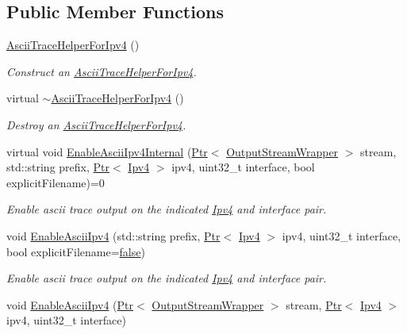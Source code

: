 \subsection*{Public Member Functions}
\begin{DoxyCompactItemize}
\item 
\hyperlink{classns3_1_1AsciiTraceHelperForIpv4_a7cc73dd91edbb5d28199b3a6654465da}{Ascii\+Trace\+Helper\+For\+Ipv4} ()
\begin{DoxyCompactList}\small\item\em Construct an \hyperlink{classns3_1_1AsciiTraceHelperForIpv4}{Ascii\+Trace\+Helper\+For\+Ipv4}. \end{DoxyCompactList}\item 
virtual \hyperlink{classns3_1_1AsciiTraceHelperForIpv4_a3d9df80563dbc6f871b49479ee050883}{$\sim$\+Ascii\+Trace\+Helper\+For\+Ipv4} ()
\begin{DoxyCompactList}\small\item\em Destroy an \hyperlink{classns3_1_1AsciiTraceHelperForIpv4}{Ascii\+Trace\+Helper\+For\+Ipv4}. \end{DoxyCompactList}\item 
virtual void \hyperlink{classns3_1_1AsciiTraceHelperForIpv4_afe9e8a865d66140f0b2b42b5381b437d}{Enable\+Ascii\+Ipv4\+Internal} (\hyperlink{classns3_1_1Ptr}{Ptr}$<$ \hyperlink{classns3_1_1OutputStreamWrapper}{Output\+Stream\+Wrapper} $>$ stream, std\+::string prefix, \hyperlink{classns3_1_1Ptr}{Ptr}$<$ \hyperlink{classns3_1_1Ipv4}{Ipv4} $>$ ipv4, uint32\+\_\+t interface, bool explicit\+Filename)=0
\begin{DoxyCompactList}\small\item\em Enable ascii trace output on the indicated \hyperlink{classns3_1_1Ipv4}{Ipv4} and interface pair. \end{DoxyCompactList}\item 
void \hyperlink{classns3_1_1AsciiTraceHelperForIpv4_af8eabc53dedba6de2921a3fb2330b44d}{Enable\+Ascii\+Ipv4} (std\+::string prefix, \hyperlink{classns3_1_1Ptr}{Ptr}$<$ \hyperlink{classns3_1_1Ipv4}{Ipv4} $>$ ipv4, uint32\+\_\+t interface, bool explicit\+Filename=\hyperlink{lte__cqi__generation_8m_ab1bef239d413c4da139c4bac92cd657a}{false})
\begin{DoxyCompactList}\small\item\em Enable ascii trace output on the indicated \hyperlink{classns3_1_1Ipv4}{Ipv4} and interface pair. \end{DoxyCompactList}\item 
void \hyperlink{classns3_1_1AsciiTraceHelperForIpv4_ad1584088224aad7ccde53bb798f6fca7}{Enable\+Ascii\+Ipv4} (\hyperlink{classns3_1_1Ptr}{Ptr}$<$ \hyperlink{classns3_1_1OutputStreamWrapper}{Output\+Stream\+Wrapper} $>$ stream, \hyperlink{classns3_1_1Ptr}{Ptr}$<$ \hyperlink{classns3_1_1Ipv4}{Ipv4} $>$ ipv4, uint32\+\_\+t interface)

\end{DoxyCompactItemize}
